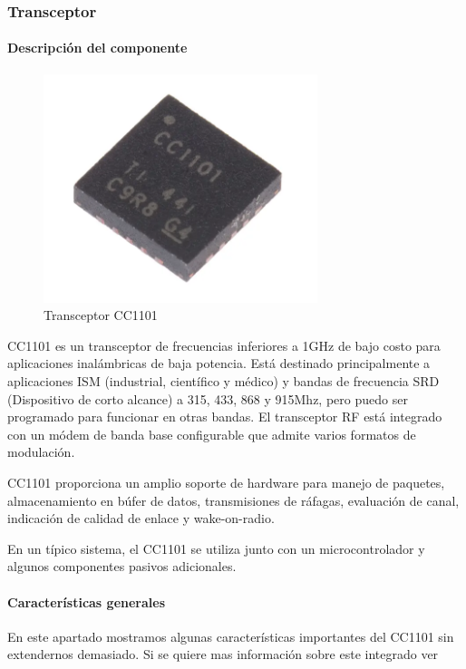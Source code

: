 \subsubsection{Transceptor}
\paragraph{Descripción del componente} \par


\begin{figure}[htb]
	\centering
	\includegraphics[scale=0.6]{images/CC1101.png}
    \caption{Transceptor CC1101}
	\label{fig:cc1101}
\end{figure}

CC1101 es un transceptor de frecuencias inferiores a 1GHz de bajo costo para aplicaciones inalámbricas de baja potencia. Está destinado principalmente
a aplicaciones ISM (industrial, científico y médico) y bandas de frecuencia SRD (Dispositivo de corto alcance) a 315, 433, 868 y 915Mhz, pero puedo ser programado 
para funcionar en otras bandas. El transceptor RF está integrado con un módem de banda base configurable que admite varios formatos de modulación.\par 
CC1101 proporciona un amplio soporte de hardware para manejo de paquetes, almacenamiento en búfer de datos, transmisiones de ráfagas, evaluación de canal,
indicación de calidad de enlace y wake-on-radio. \par 
En un típico sistema, el CC1101 se utiliza junto con un microcontrolador y algunos componentes pasivos adicionales.

\paragraph{Características generales} \par

En este apartado mostramos algunas características importantes del CC1101 sin extendernos demasiado. Si se quiere mas información sobre este integrado ver \todo 

